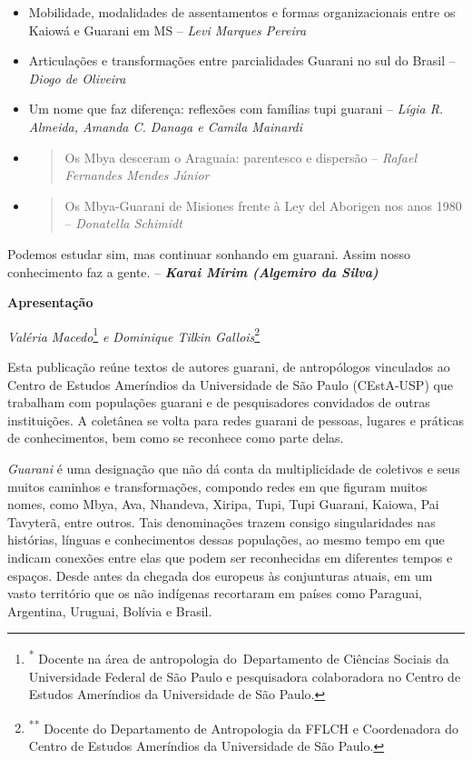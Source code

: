 \begin{itemize}
\item
  Mobilidade, modalidades de assentamentos e formas organizacionais
  entre os Kaiowá e Guarani em MS -- \emph{Levi Marques Pereira}
\item
  Articulações e transformações entre parcialidades Guarani no sul do
  Brasil -- \emph{Diogo de Oliveira}
\item
  Um nome que faz diferença: reflexões com famílias tupi guarani --
  \emph{Lígia R. Almeida, Amanda C. Danaga e Camila Mainardi}
\end{itemize}

\begin{itemize}
\item
  \begin{quote}
  Os Mbya desceram o Araguaia: parentesco e dispersão -- \emph{Rafael
  Fernandes Mendes Júnior }
  \end{quote}
\item
  \begin{quote}
  Os Mbya-Guarani de Misiones frente à Ley del Aborigen nos anos 1980 --
  \emph{Donatella Schimidt}
  \end{quote}
\end{itemize}

Podemos estudar sim, mas continuar sonhando em guarani. Assim nosso
conhecimento faz a gente. -- \emph{\textbf{Karai Mirim (Algemiro da
Silva)}}

\textbf{Apresentação}

\emph{Valéria Macedo}\footnote{\textsuperscript{*} Docente na área de
  antropologia do~Departamento de Ciências Sociais da Universidade
  Federal de São Paulo e pesquisadora colaboradora no Centro de Estudos
  Ameríndios da Universidade de São Paulo.} \emph{e Dominique Tilkin
Gallois}\footnote{\textsuperscript{**} Docente do Departamento de
  Antropologia da FFLCH e Coordenadora do Centro de Estudos Ameríndios
  da Universidade de São Paulo.}

Esta publicação reúne textos de autores guarani, de antropólogos
vinculados ao Centro de Estudos Ameríndios da Universidade de São Paulo
(CEstA-USP) que trabalham com populações guarani e de pesquisadores
convidados de outras instituições. A coletânea se volta para redes
guarani de pessoas, lugares e práticas de conhecimentos, bem como se
reconhece como parte delas.

\emph{Guarani} é uma designação que não dá conta da multiplicidade de
coletivos e seus muitos caminhos e transformações, compondo redes em que
figuram muitos nomes, como Mbya, Ava, Nhandeva, Xiripa, Tupi, Tupi
Guarani, Kaiowa, Pai Tavyterã, entre outros. Tais denominações trazem
consigo singularidades nas histórias, línguas e conhecimentos dessas
populações, ao mesmo tempo em que indicam conexões entre elas que podem
ser reconhecidas em diferentes tempos e espaços. Desde antes da chegada
dos europeus às conjunturas atuais, em um vasto território que os não
indígenas recortaram em países como Paraguai, Argentina, Uruguai,
Bolívia e Brasil.


